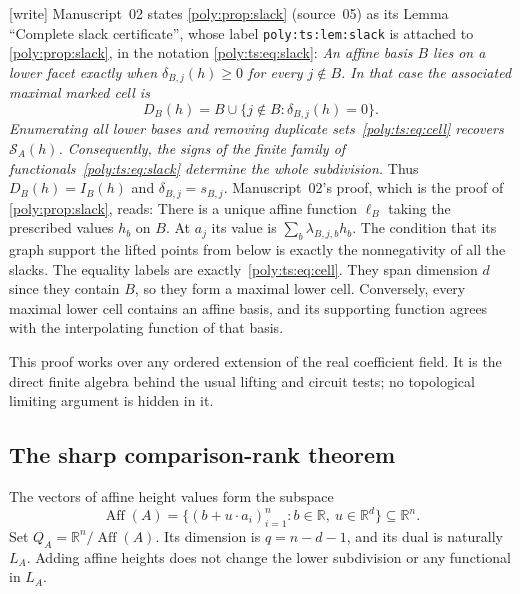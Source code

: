 \documentclass[11pt,a4paper]{article}
\numberwithin{equation}{section}
\theoremstyle{plain}
\newcommand{\wtag}{\textup{[write]}}%
\newcommand{\R}{\mathbb R}
\newcommand{\cS}{\mathcal S}
\newcommand{\Aff}{\operatorname{Aff}}
\begin{document}
\begin{remark}\label{poly:ts:rem:slack02}
\wtag{} Manuscript~02 states \cref{poly:prop:slack} (source~05) as its Lemma
``Complete slack certificate'', whose label \texttt{poly:ts:lem:slack} is
attached to \cref{poly:prop:slack}, in the notation
\eqref{poly:ts:eq:slack}:
\emph{
An affine basis $B$ lies on a lower facet exactly when
$\delta_{B,j}(h)\ge0$ for every $j\notin B$. In that case the associated
maximal marked cell is
\begin{equation}\label{poly:ts:eq:cell}
 D_B(h)=B\cup\{j\notin B:\delta_{B,j}(h)=0\}.
\end{equation}
Enumerating all lower bases and removing duplicate sets~\eqref{poly:ts:eq:cell}
recovers $\cS_A(h)$. Consequently, the signs of the finite family of
functionals~\eqref{poly:ts:eq:slack} determine the whole subdivision.
}
\noindent Thus $D_B(h)=I_B(h)$ and $\delta_{B,j}=s_{B,j}$. Manuscript~02's
proof, which is the proof of \cref{poly:prop:slack}, reads:
There is a unique affine function $\ell_B$ taking the prescribed values
$h_b$ on $B$. At $a_j$ its value is
$\sum_b\lambda_{B,j,b}h_b$. The condition that its graph support the
lifted points from below is exactly the nonnegativity of all the slacks.
The equality labels are exactly~\eqref{poly:ts:eq:cell}. They span dimension $d$
since they contain $B$, so they form a maximal lower cell. Conversely,
every maximal lower cell contains an affine basis, and its supporting
function agrees with the interpolating function of that basis.
\end{remark}

This proof works over any ordered extension of the real coefficient field.
It is the direct finite algebra behind the usual lifting and circuit tests;
no topological limiting argument is hidden in it.

\subsection{The sharp comparison-rank theorem}
The vectors of affine height values form the subspace
\[
 \Aff(A)=\{(b+u\cdot a_i)_{i=1}^n:b\in\R,\ u\in\R^d\}\subseteq\R^n.
\]
Set $Q_A=\R^n/\Aff(A)$. Its dimension is $q=n-d-1$, and its dual is
naturally $L_A$. Adding affine heights does not change the lower
subdivision or any functional in $L_A$.
\end{document}
